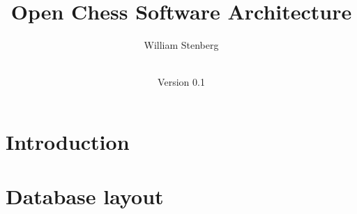\documentclass[a4paper,11pt,x11 names]{article}
\title{Open Chess Software Architecture}
\date{\documentdate\\Version 0.1}
\author{William Stenberg}
\begin{document}
\maketitle
\section*{Introduction}

\section*{Database layout}

\end{document}
